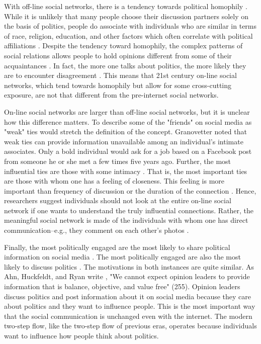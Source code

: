 \documentclass[12pt]{article}
\begin{document}
\begin{doublespace}
With off-line social networks, there is a tendency towards political homophily \citep{XXXX}.  While it is unlikely that many people choose their discussion partners solely on the basis of politics, people do associate with individuals who are similar in terms of race, religion, education, and other factors which often correlate with political affiliations \citep{McPhersonSmithLovinCook2001}. Despite the tendency toward homophily, the complex patterns of social relations allows people to hold opinions different from some of their acquaintances \citep{HuckfeldtJohnsonSprague2004}. In fact, the more one talks about politics, the more likely they are to encounter disagreement \citep{HuckfeldtMendez2008}. This means that 21st century on-line social networks, which tend towards homophily but allow for some cross-cutting exposure, are not that different from the pre-internet social networks.

On-line social networks are larger than off-line social networks, but it is unclear how this difference matters. To describe some of the "friends" on social media as "weak" ties would stretch the definition of the concept. Granovetter \citeyearpar{Granovetter1973} noted that weak ties can provide information unavailable among an individual's intimate associates. Only a bold individual would ask for a job based on a Facebook post from someone he or she met a few times five years ago. Further, the most influential ties are those with some intimacy \citep{Kenny1998}. That is, the most important ties are those with whom one has a feeling of closeness. This feeling is more important than frequency of discussion or the duration of the connection \citep{MarsdenCampbell1984}. Hence, researchers suggest individuals should not look at the entire on-line social network if one wants to understand the truly influential connections. Rather, the meaningful social network is made of the individuals with whom one has direct communication--e.g., they comment on each other's photos \citep{XXXX}.

Finally, the most politically engaged are the most likely to share political information on social media \citep{XXXX}. The most politically engaged are also the most likely to discuss politics \citep{Huckfeldt2001}. The motivations in both instances are quite similar. As Ahn, Huckfeldt, and Ryan write \citeyearpar{AhnHuckfeldtRyan2014}, "We cannot expect opinion leaders to provide information that is balance, objective, and value free" (255). Opinion leaders discuss politics and post information about it on social media because they care about politics and they want to influence people. This is the most important way that the social communication is unchanged even with the internet. The modern two-step flow, like the two-step flow of previous eras, operates because individuals want to influence how people think about politics.



\end{doublespace}
\end{document}
